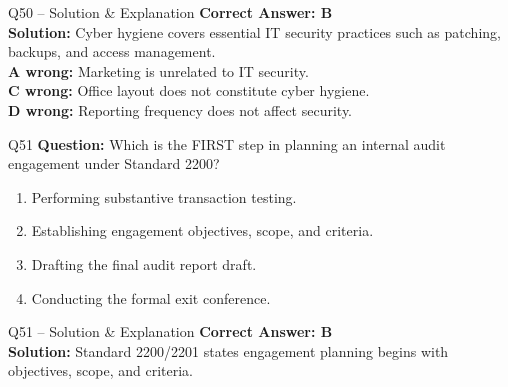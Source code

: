\documentclass[aspectratio=169,10pt]{beamer}
\begin{document}
	\begin{frame}[t]{Q50 -- Solution \& Explanation}
		\small
		\textbf{Correct Answer: B} \\[4pt]
		\textbf{Solution:} Cyber hygiene covers essential IT security practices such as patching, backups, and access management. \\[4pt]
		\textbf{A wrong:} Marketing is unrelated to IT security. \\[2pt]
		\textbf{C wrong:} Office layout does not constitute cyber hygiene. \\[2pt]
		\textbf{D wrong:} Reporting frequency does not affect security.
	\end{frame}
	
	\begin{frame}[t]{Q51}
		\small
		\textbf{Question:} Which is the FIRST step in planning an internal audit engagement under Standard 2200?
		\begin{enumerate}[label=\Alph*.,itemsep=1pt,topsep=2pt]
			\item Performing substantive transaction testing.
			\item Establishing engagement objectives, scope, and criteria.
			\item Drafting the final audit report draft.
			\item Conducting the formal exit conference.
		\end{enumerate}
	\end{frame}
	
	\begin{frame}[t]{Q51 -- Solution \& Explanation}
		\small
		\textbf{Correct Answer: B} \\[4pt]
		\textbf{Solution:} Standard 2200/2201 states engagement planning begins with objectives, scope, and criteria.
	\end{frame}
	
\end{document}

